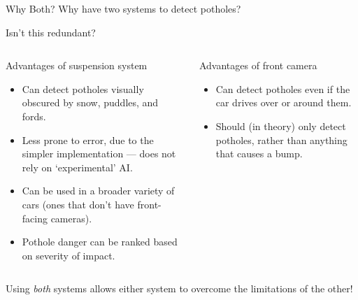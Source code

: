 \documentclass{beamer}
\begin{document}
\begin{frame}{Why Both?}
    Why have two systems to detect potholes?

    Isn't this redundant?
\end{frame}

\begin{frame}
    \begin{columns}

        \begin{block}{Advantages of suspension system}
            \begin{itemize}
                \item Can detect potholes visually obscured by snow, puddles, and fords.
                \item Less prone to error, due to the simpler implementation --- does not rely on `experimental' AI.
                \item Can be used in a broader variety of cars (ones that don't have front-facing cameras).
                \item Pothole danger can be ranked based on severity of impact.
            \end{itemize}
        \end{block}


        \begin{block}{Advantages of front camera}
            \begin{itemize}
                \item Can detect potholes even if the car drives over or around them.
                \item Should (in theory) \alert{only} detect potholes, rather than anything that causes a bump.
            \end{itemize}
        \end{block}

    \end{columns}

    \vspace{0.4cm}
    Using \emph{both} systems allows either system to overcome the limitations of the other!
\end{frame}
\end{document}

